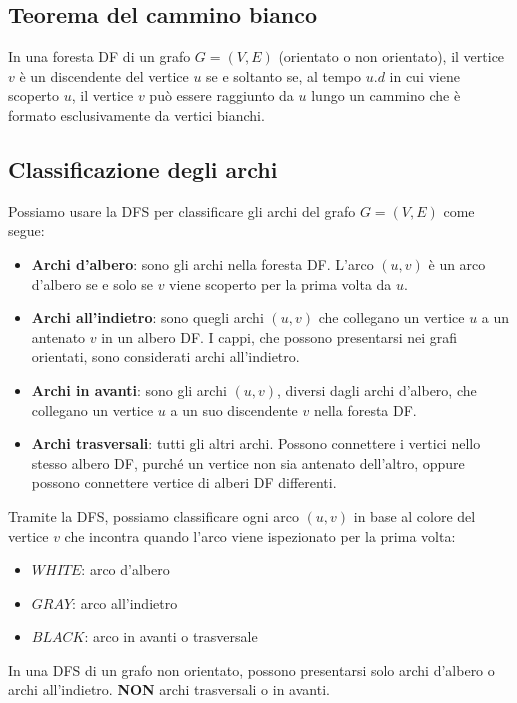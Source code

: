\subsection{Teorema del cammino bianco}
In una foresta DF di un grafo $G = (V, E)$ (orientato o non orientato), il vertice $v$ è un discendente del vertice $u$ se e soltanto se, al tempo $u.d$ in cui viene scoperto $u$, il vertice $v$ può essere raggiunto da $u$ lungo un cammino che è formato esclusivamente da vertici bianchi.

\subsection{Classificazione degli archi}
Possiamo usare la DFS per classificare gli archi del grafo $G = (V, E)$ come segue:
    \begin{itemize}
        \item{\textbf{Archi d'albero}: sono gli archi nella foresta DF. L'arco $(u,v)$ è un arco d'albero se e solo se $v$ viene scoperto per la prima volta da $u$.}
        \item{\textbf{Archi all'indietro}: sono quegli archi $(u,v)$ che collegano un vertice $u$ a un antenato $v$ in un albero DF. I cappi, che possono presentarsi nei grafi orientati, sono considerati archi all'indietro.}
        \item{\textbf{Archi in avanti}: sono gli archi $(u,v)$, diversi dagli archi d'albero, che collegano un vertice $u$ a un suo discendente $v$ nella foresta DF.}
        \item{\textbf{Archi trasversali}: tutti gli altri archi. Possono connettere i vertici nello stesso albero DF, purché un vertice non sia antenato dell'altro, oppure possono connettere vertice di alberi DF differenti.}
    \end{itemize}
Tramite la DFS, possiamo classificare ogni arco $(u,v)$ in base al colore del vertice $v$ che incontra quando l'arco viene ispezionato per la prima volta:
    \begin{itemize}
        \item{$WHITE$: arco d'albero}
        \item{$GRAY$: arco all'indietro}
        \item{$BLACK$: arco in avanti o trasversale}
    \end{itemize}
In una DFS di un grafo non orientato, possono presentarsi solo archi d'albero o archi all'indietro. \textbf{NON} archi trasversali o in avanti.

